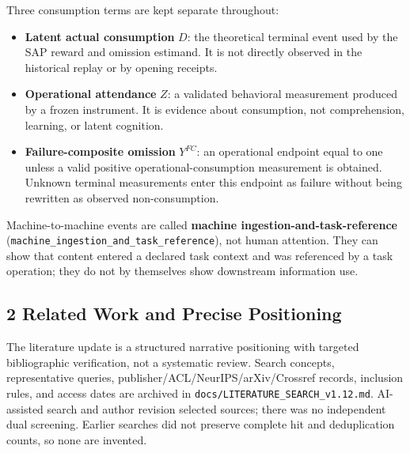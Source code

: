 \documentclass[
  11pt]{article}
\providecommand{\tightlist}{%
  \setlength{\itemsep}{0pt}\setlength{\parskip}{0pt}}
\begin{document}
Three consumption terms are kept separate throughout:

\begin{itemize}
\tightlist
\item
  \textbf{Latent actual consumption} \(D\): the theoretical terminal
  event used by the SAP reward and omission estimand. It is not directly
  observed in the historical replay or by opening receipts.
\item
  \textbf{Operational attendance} \(Z\): a validated behavioral
  measurement produced by a frozen instrument. It is evidence about
  consumption, not comprehension, learning, or latent cognition.
\item
  \textbf{Failure-composite omission} \(Y^{FC}\): an operational
  endpoint equal to one unless a valid positive operational-consumption
  measurement is obtained. Unknown terminal measurements enter this
  endpoint as failure without being rewritten as observed
  non-consumption.
\end{itemize}

Machine-to-machine events are called \textbf{machine
ingestion-and-task-reference}
(\texttt{machine\_ingestion\_and\_task\_reference}), not human
attention. They can show that content entered a declared task context
and was referenced by a task operation; they do not by themselves show
downstream information use.

\subsection{2 Related Work and Precise
Positioning}\label{related-work-and-precise-positioning}

The literature update is a structured narrative positioning with
targeted bibliographic verification, not a systematic review. Search
concepts, representative queries, publisher/ACL/NeurIPS/arXiv/Crossref
records, inclusion rules, and access dates are archived in
\texttt{docs/LITERATURE\_SEARCH\_v1.12.md}. AI-assisted search and
author revision selected sources; there was no independent dual
screening. Earlier searches did not preserve complete hit and
deduplication counts, so none are invented.
\end{document}
